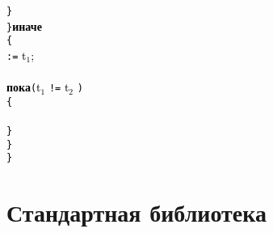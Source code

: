 \documentclass[10pt]{report}
\begin{document}
{{		\phantom{конец}\textcolor{Black}{\texttt{\}}}\\
		\textcolor{Black}{\texttt{\}}}\textcolor{Black}{\textbf{иначе}}\\
		\textcolor{Black}{\texttt{\{}}\\
		\phantom{конец} \textcolor{Black}{\texttt{:=}} \textcolor{Black}{t$_1$}\textcolor{Black}{;}\\
		\phantom{конец}\rbo{} \sor {}\rbc\kleene\\
		\phantom{конец}\textcolor{Black}{\textbf{пока}}\textcolor{Black}{\texttt{(}}\textcolor{Black}{t$_1$} \textcolor{Black}{\texttt{!=}} \textcolor{Black}{t$_2$}%
		\textcolor{Black}{\texttt{)}}\\
		\phantom{конец}\textcolor{Black}{\texttt{\{}}\\
		\phantom{конецмоимс}\rbo{} \sor {}\rbc\kleene\\
		\phantom{конец}\textcolor{Black}{\texttt{\}}}\\
		\textcolor{Black}{\texttt{\}}}\\
		\textcolor{Black}{\texttt{\}}}
}}

\part{Стандартная библиотека}
\end{document}
